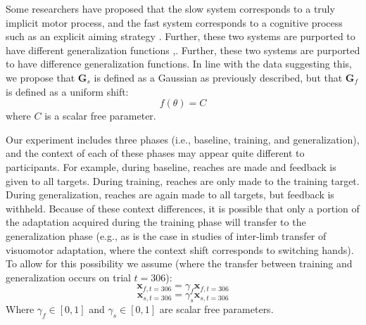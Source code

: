 \documentclass[man, 11pt, longtable, floatsintext, notab]{apa6}
\begin{document}
Some researchers have proposed that the slow system
corresponds to a truly implicit motor process, and the fast
system corresponds to a cognitive process such as an
explicit aiming strategy \cite{mcdougle_taking_2016}.
Further, these two systems are purported to have different
generalization functions
\cite{heuer_generalization_2011},\cite{mcdougle_implications_2017}.
Further, these two systems are purported to have difference
generalization functions. In line with the data suggesting
this, we propose that $\boldsymbol{G}_{s}$ is defined as a
Gaussian as previously described, but that
$\boldsymbol{G}_{f}$ is defined as a uniform shift:
\begin{equation}
  f(\theta) = C
\end{equation}
where $C$ is a scalar free parameter.

Our experiment includes three phases (i.e., baseline,
training, and generalization), and the context of each of
these phases may appear quite different to participants. For
example, during baseline, reaches are made and feedback is
given to all targets. During training, reaches are only made
to the training target. During generalization, reaches are
again made to all targets, but feedback is withheld. Because
of these context differences, it is possible that only a
portion of the adaptation acquired during the training phase
will transfer to the generalization phase (e.g., as is the
case in studies of inter-limb transfer of visuomotor
adaptation, where the context shift corresponds to switching
hands). To allow for this possibility we assume (where the
transfer between training and generalization occurs on trial
$t=306$):
\begin{equation}
  \boldsymbol{x}_{f, t=306} = \gamma_{f} \boldsymbol{x}_{f, t=306} 
\end{equation}
\begin{equation}
  \boldsymbol{x}_{s, t=306} = \gamma_{s} \boldsymbol{x}_{s, t=306} 
\end{equation}
Where $\gamma_{f} \in [0,1]$ and $\gamma_{s} \in [0,1]$ are
scalar free parameters. 
\end{document}

